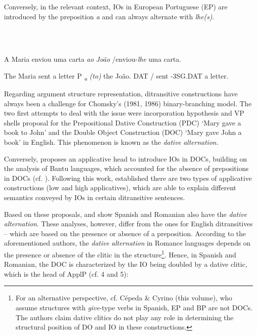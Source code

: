 \documentclass[output=paper,modfonts,nonflat]{langsci/langscibook}
\begin{document}
\begin{styleBodyTextii}
Conversely, in the relevant context, IOs in European Portuguese (EP) are introduced by the preposition \textit{a} and can always alternate with \textit{lhe(s)}.
\end{styleBodyTextii}

\begin{styleBodyTextii}
\ea%
    \label{ex:key:3}
    \gll\\
        \\
    \glt
    \z

         A    Maria enviou uma carta \textit{ao} \textit{João}            /enviou-\textit{lhe}          uma carta. 
\end{styleBodyTextii}

\begin{styleBodyTextii}
       The Maria sent     a letter      P\textsubscript{} \textit{\textsubscript{a} \textit{(to)}} the João. DAT  / sent -3SG.DAT  a letter.  
\end{styleBodyTextii}

Regarding argument structure representation, ditransitive constructions have always been a challenge for Chomsky’s (1981, 1986) binary-branching model. The two first attempts to deal with the issue were  incorporation hypothesis and  VP shells proposal for the Prepositional Dative Construction (PDC) ‘Mary gave a book to John’ and the Double Object Construction (DOC) ‘Mary gave John a book’ in English. This phenomenon is known as the \textit{dative} \textit{alternation.} 

Conversely, \citet{Marantz1993} proposes an applicative head to introduce IOs in DOCs, building on the analysis of Bantu languages, which accounted for the absence of prepositions in DOCs (cf. \citealt{AlsinaMchombo1993}). Following this work, \citet{Pylkkännen2002} established there are two types of applicative constructions (low and high applicatives), which are able to explain different semantics conveyed by IOs in certain ditransitive sentences. 

Based on these proposals, \citet{Cuervo2003} and \citet{DiaconescuRivero2007} show Spanish and Romanian also have the \textit{dative} \textit{alternation}. These analyses, however, differ from the ones for English ditransitives – which are based on the presence or absence of a preposition. According to the aforementioned authors, the \textit{dative} \textit{alternation} in Romance languages depends on the presence or absence of the clitic in the structure\footnote{\textrm{For an alternative perspective, cf. Cépeda \& Cyrino (this volume), who assume structures with} \textrm{\textit{give}}\textrm{{}-type verbs in Spanish, EP and BP are not DOCs. The authors claim dative clitics do not play any role in determining the structural position of DO and IO in these constructions.}}. Hence, in Spanish and Romanian, the DOC is characterized by the IO being doubled by a dative clitic, which is the head of ApplP (cf. 4 and 5):
\end{document}
